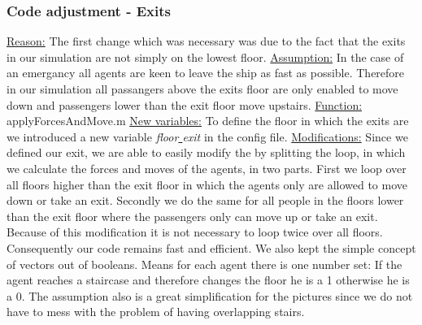 \documentclass[11pt]{article}
\begin{document}
\subsubsection{Code adjustment - Exits}
\underline{Reason:}
\newline
The first change which was necessary was due to the fact that the exits in our simulation are not simply on the lowest floor.
\newline
\underline{Assumption:}
\newline
In the case of an emergancy all agents are keen to leave the ship as fast as possible. Therefore in our simulation all passangers above the exits floor are only enabled to move down and passengers lower than the exit floor move upstairs.
\newline
\underline{Function:}
\newline
applyForcesAndMove.m
\newline
\underline{New variables:}
\newline 
To define the floor in which the exits are we introduced a new variable \textit{floor\underline{ }exit} in the config file.
\newline
\underline{Modifications:}
\newline
Since we defined our exit, we are able to easily modify the by splitting the loop, in which we calculate the forces and moves of the agents, in two parts. First we loop over all floors higher than the exit floor in which the agents only are allowed to move down or take an exit. Secondly we do the same for all people in the floors lower than the exit floor where the passengers only can move up or take an exit.
\newline
Because of this modification it is not necessary to loop twice over all floors. Consequently our code remains fast and efficient. We also kept the simple concept of vectors out of booleans. Means for each agent there is one number set: If the agent reaches a staircase and therefore changes the floor he is a 1 otherwise he is a 0. The assumption also is a great simplification for the pictures since we do not have to mess with the problem of having overlapping stairs.
\end{document}
